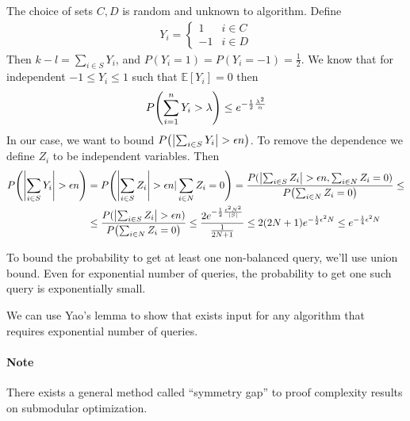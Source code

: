 \begin{theorem}
	The choice of sets $C,D$ is random and unknown to algorithm. Define 
	\begin{align}
	Y_i = \begin{cases}
	1 & i\in C\\
	-1 & i\in D
	\end{cases}
	\end{align}
	Then $k-l = \sum_{i \in S} Y_i$, and $P(Y_i=1)=P(Y_i=-1)=\frac{1}{2}$. We know that for independent $-1\leq Y_i\leq 1$ such that $\mathbb{E} [Y_i] = 0$ then
	\begin{align}
		P\qty(\sum_{i =1}^n Y_i > \lambda) \leq e^{-\frac{1}{2}\frac{\lambda^2}{n}}
	\end{align}
	In our case, we want to bound $P\qty(\abs{\sum_{i \in S} Y_i} > \epsilon n)$. To remove the dependence we define $Z_i$ to be independent variables. Then
	\begin{align}
	P\qty(\abs{\sum_{i \in S} Y_i} > \epsilon n) &= 	P\qty(\abs{\sum_{i \in S} Z_i} > \epsilon n | \sum_{i\in N} Z_i = 0)  = \frac{P(\abs{\sum_{i \in S} Z_i} > \epsilon n , \sum_{i\in N} Z_i = 0)}{P\qty(\sum_{i\in N} Z_i = 0)} \leq\\&\leq \frac{P(\abs{\sum_{i \in S} Z_i} > \epsilon n)}{P\qty(\sum_{i\in N} Z_i = 0)} \leq \frac{2e^{-\frac{1}{2} \frac{\epsilon^2 N^2}{\abs{S}}}}{\frac{1}{2N+1}} \leq 2(2N+1)e^{-\frac{1}{2} \epsilon^2 N} \leq e^{-\frac{1}{4} \epsilon^2 N}
	\end{align}
	
	To bound the probability to get at least one non-balanced query, we'll use union bound. Even for exponential number of queries, the probability to get one such query is exponentially small.
	
	We can use Yao's lemma to show that exists input for any algorithm that requires exponential number of queries.
\end{theorem}


\paragraph{Note} There exists a general method called ``symmetry gap'' \cite{vondrak2013symmetry} to proof complexity results on submodular optimization.